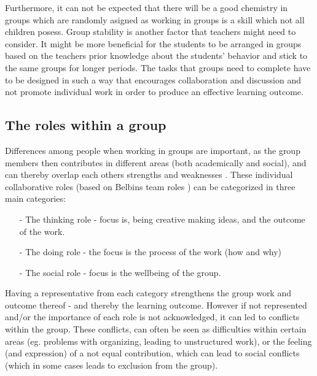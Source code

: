 Furthermore, it can not be expected that there will be a good chemistry in groups which are randomly asigned as working in groups is a skill which not all children posess. Group stability is another factor that teachers might need to consider. It might be more beneficial for the students to be arranged in groups based on the teachers prior knowledge about the students' behavior and stick to the same groups for longer periods. The tasks that groups need to complete have to be designed in such a way that encourages collaboration and discussion and not promote individual work in order to produce an effective learning outcome\cite{collaborationSocialPedagogy}.



\subsection{The roles within a group}
Differences among people when working in groups are important, as the group members then contributes in different areas (both academically and social), and can thereby overlap each others strengths and weaknesses \cite{ProjektarbejdesKompleksitet}. These individual collaborative roles (based on Belbins team roles \cite{ProjektarbejdesKompleksitet}) can be categorized in three main categories: 
\begin{itemize}
	\item[-] The thinking role - focus is, being creative making ideas, and the outcome of the work. 
	\item[-] The doing role - the focus is the process of the work (how and why)
	\item[-] The social role - focus is the wellbeing of the group. 
\end{itemize}

Having a representative from each category strengthens the group work and outcome thereof - and thereby the learning outcome\cite{ProjektarbejdesKompleksitet}. However if not represented and/or the importance of each role is not acknowledged, it can led to conflicts within the group. These conflicts, can often be seen as difficulties within certain areas (eg. problems with organizing, leading to unstructured work), or the feeling (and expression) of a not equal contribution, which can lead to social conflicts (which in some cases leads to exclusion from the group)\cite{ProjektarbejdesKompleksitet}. 

